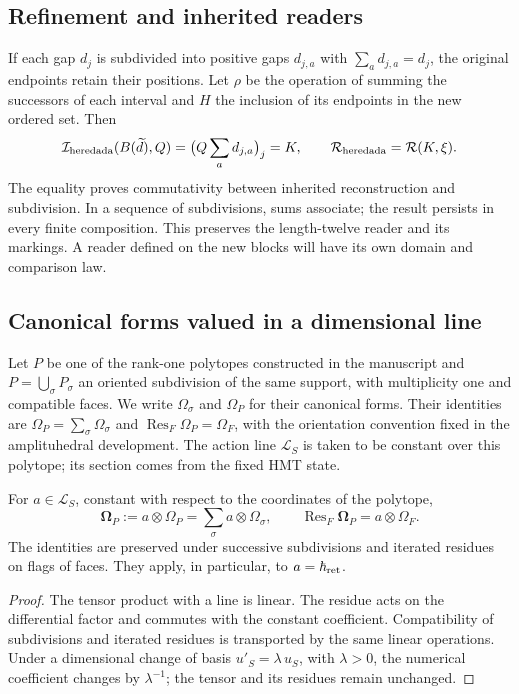 \subsection{Refinement and inherited readers}

If each gap \(d_j\) is subdivided into positive gaps
\(d_{j,a}\) with \(\sum_ad_{j,a}=d_j\), the original endpoints
retain their positions. Let \(\rho\) be the operation of summing the successors
of each interval and \(H\) the inclusion of its endpoints in the new
ordered set. Then
\[
 \mathcal I_{\rm heredada}(B(\widetilde d),Q)
 =\bigl(Q\sum_ad_{j,a}\bigr)_j=K,
 \qquad
 \mathcal R_{\rm heredada}=\mathcal R(K,\xi).
\]
The equality proves commutativity between inherited reconstruction and
subdivision. In a sequence of subdivisions, sums associate;
the result persists in every finite composition. This preserves the
length-twelve reader and its markings. A reader defined on the
new blocks will have its own domain and comparison law.

\subsection{Canonical forms valued in a dimensional line}

Let \(P\) be one of the rank-one polytopes constructed in the
manuscript and \(P=\bigcup_\sigma P_\sigma\) an oriented
subdivision of the same support, with multiplicity one and compatible faces.
We write \(\Omega_\sigma\) and \(\Omega_P\) for their canonical
forms. Their identities are
\(\Omega_P=\sum_\sigma\Omega_\sigma\) and
\(\operatorname{Res}_F\Omega_P=\Omega_F\), with the orientation
convention fixed in the amplituhedral development.
The action line \(\mathcal L_S\) is taken to be constant over
this polytope; its section comes from the fixed HMT state.

\begin{theorem}
\label{thm:compat-forma-accion}
For \(a\in\mathcal L_S\), constant with respect to the coordinates
of the polytope,
\[
 \boldsymbol\Omega_P:=a\otimes\Omega_P
 =\sum_\sigma a\otimes\Omega_\sigma,
 \qquad
 \operatorname{Res}_F\boldsymbol\Omega_P=a\otimes\Omega_F.
\]
The identities are preserved under successive subdivisions and iterated
residues on flags of faces. They apply, in particular, to
\(a=\hbar_{\rm ret}\).
\end{theorem}
\begin{proof}
The tensor product with a line is linear. The residue acts on
the differential factor and commutes with the constant coefficient.
Compatibility of subdivisions and iterated residues is transported
by the same linear operations. Under a dimensional change of basis
\(u'_S=\lambda\,u_S\), with \(\lambda>0\), the numerical coefficient
changes by \(\lambda^{-1}\);
the tensor and its residues remain unchanged.
\end{proof}

